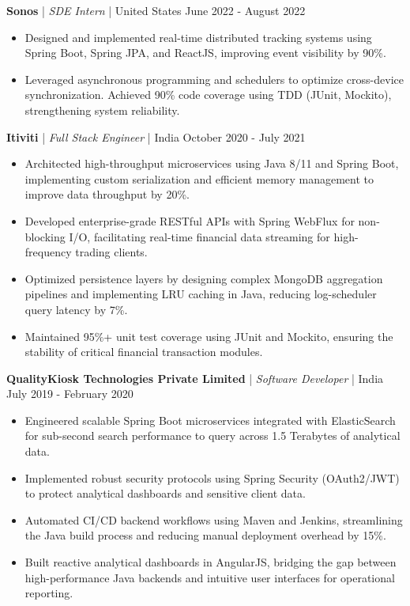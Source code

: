 \documentclass[9pt,letterpaper]{extarticle}
\begin{document}
\vspace{3pt}
\textbf{Sonos} | \textit{SDE Intern} | United States \hfill June 2022 - August 2022
\begin{itemize}[leftmargin=0.15in, noitemsep, topsep=2pt, partopsep=0pt, parsep=0pt]
    \item Designed and implemented real-time distributed tracking systems using Spring Boot, Spring JPA, and ReactJS, improving event visibility by 90\%.
    \item Leveraged asynchronous programming and schedulers to optimize cross-device synchronization. Achieved 90\% code coverage using TDD (JUnit, Mockito), strengthening system reliability.
\end{itemize}

\vspace{3pt}
\textbf{Itiviti} | \textit{Full Stack Engineer} | India \hfill October 2020 - July 2021
\begin{itemize}[leftmargin=0.15in, noitemsep, topsep=2pt, partopsep=0pt, parsep=0pt]
    \item Architected high-throughput microservices using Java 8/11 and Spring Boot, implementing custom serialization and efficient memory management to improve data throughput by 20\%.
    \item Developed enterprise-grade RESTful APIs with Spring WebFlux for non-blocking I/O, facilitating real-time financial data streaming for high-frequency trading clients.
    \item Optimized persistence layers by designing complex MongoDB aggregation pipelines and implementing LRU caching in Java, reducing log-scheduler query latency by 7\%.
    \item Maintained 95\%+ unit test coverage using JUnit and Mockito, ensuring the stability of critical financial transaction modules.
\end{itemize}

\vspace{3pt}
\textbf{QualityKiosk Technologies Private Limited} | \textit{Software Developer} | India \hfill July 2019 - February 2020
\begin{itemize}[leftmargin=0.15in, noitemsep, topsep=2pt, partopsep=0pt, parsep=0pt]
    \item Engineered scalable Spring Boot microservices integrated with ElasticSearch for sub-second search performance to query across 1.5 Terabytes of analytical data.
    \item Implemented robust security protocols using Spring Security (OAuth2/JWT) to protect analytical dashboards and sensitive client data.
    \item Automated CI/CD backend workflows using Maven and Jenkins, streamlining the Java build process and reducing manual deployment overhead by 15\%.
    \item Built reactive analytical dashboards in AngularJS, bridging the gap between high-performance Java backends and intuitive user interfaces for operational reporting.
\end{itemize}
\end{document}
